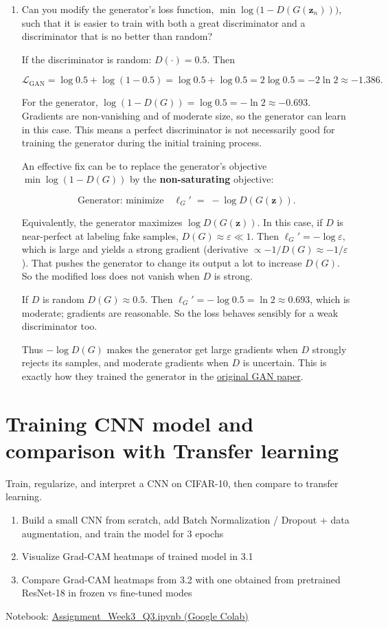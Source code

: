\documentclass[12pt,a4paper]{article}
\begin{document}
\begin{enumerate}
    \item Can you modify the generator’s loss function, $\min \log\bigl(1 - D(G(\mathbf{z}_n))\bigr)$, such that it is easier to train with both a great discriminator and a discriminator that is no better than random?

    If the discriminator is random: $D(\cdot)=0.5$. Then

$$
\mathcal{L}_{\mathrm{GAN}}=\log 0.5 + \log(1-0.5)=\log 0.5+\log 0.5 = 2\log 0.5 = -2\ln 2 \approx -1.386.
$$

For the generator, $\log(1-D(G))=\log 0.5 = -\ln 2 \approx -0.693$. Gradients are non-vanishing and of moderate size, so the generator can learn in this case. 
This means a perfect discriminator is not necessarily good for training the generator during the initial training process.

An effective fix can be to replace the generator's objective $\min \log(1-D(G))$ by the \textbf{non-saturating} objective:

$$
\text{Generator: minimize}\quad \ell_G' \;=\; -\log D(G(\mathbf{z})).
$$

Equivalently, the generator maximizes $\log D(G(\mathbf{z}))$. In this case, if $D$ is near-perfect at labeling fake samples, $D(G)\approx\varepsilon\ll 1$. 
Then $\ell_G' = -\log \varepsilon$, which is large and yields a strong gradient (derivative $\propto -1/D(G)\approx -1/\varepsilon$). That pushes the generator to change its output a lot to increase $D(G)$. So the modified loss does not vanish when $D$ is strong.

If $D$ is random $D(G) \approx 0.5$. Then $\ell_G' = -\log 0.5 = \ln 2 \approx 0.693$, which is moderate; gradients are reasonable. So the loss behaves sensibly for a weak discriminator too.

Thus $-\log D(G)$ makes the generator get large gradients when $D$ strongly rejects its samples, and moderate gradients when $D$ is uncertain. 
This is exactly how they trained the generator in the \href{https://arxiv.org/pdf/1406.2661.pdf}{original GAN paper}.

\end{enumerate}

\section{Training CNN model and comparison with Transfer learning}

Train, regularize, and interpret a CNN on CIFAR-10, then compare to transfer learning.
\begin{enumerate}
    \item Build a small CNN from scratch, add Batch Normalization / Dropout + data augmentation, and train the model for 3 epochs

    \item Visualize Grad-CAM heatmaps of trained model in 3.1

    \item Compare Grad-CAM heatmaps from 3.2 with one obtained from pretrained ResNet-18 in frozen vs fine-tuned modes
\end{enumerate}

Notebook: \href{https://colab.research.google.com/drive/1_XmdeaXsWgyren1q9i2iNAo01VjwFPl-?usp=sharing}{Assignment\_Week3\_Q3.ipynb (Google Colab)}
\end{document}
